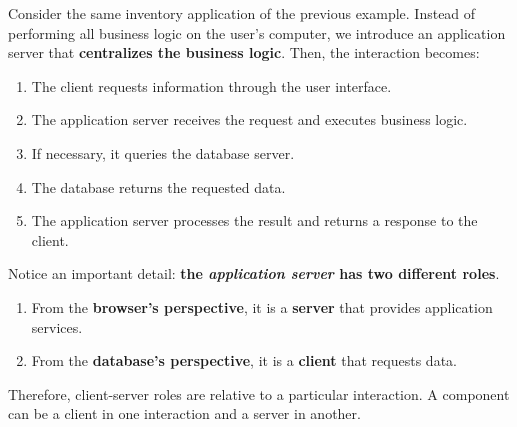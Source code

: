 \begin{figure}[H]
\end{figure}

\highspace
\begin{examplebox}
    Consider the same inventory application of the previous example. Instead of performing all business logic on the user's computer, we introduce an application server that \textbf{centralizes the business logic}. Then, the interaction becomes:
    \begin{enumerate}
        \item The client requests information through the user interface.
        \item The application server receives the request and executes business logic.
        \item If necessary, it queries the database server.
        \item The database returns the requested data.
        \item The application server processes the result and returns a response to the client.
    \end{enumerate}
\end{examplebox}

\highspace
Notice an important detail: \textbf{the \emph{application server} has two different roles}.
\begin{enumerate}
    \item From the \textbf{browser's perspective}, it is a \textbf{server} that provides application services.
    \item From the \textbf{database's perspective}, it is a \textbf{client} that requests data.
\end{enumerate}
Therefore, client-server roles are relative to a particular interaction. A component can be a client in one interaction and a server in another.

\newpage

